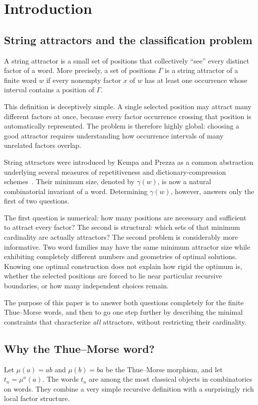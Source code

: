 \documentclass[11pt,a4paper]{article}
\theoremstyle{definition}\newtheorem{definition}[theorem]{Definition}
\theoremstyle{remark}\newtheorem{remark}[theorem]{Remark}
\begin{document}
\section{Introduction}

\subsection{String attractors and the classification problem}
A string attractor is a small set of positions that collectively ``see'' every distinct factor of a word. More precisely, a set of positions $\Gamma$ is a string attractor of a finite word $w$ if every nonempty factor $x$ of $w$ has at least one occurrence whose interval contains a position of $\Gamma$.

This definition is deceptively simple. A single selected position may attract many different factors at once, because every factor occurrence crossing that position is automatically represented. The problem is therefore highly global: choosing a good attractor requires understanding how occurrence intervals of many unrelated factors overlap.

String attractors were introduced by Kempa and Prezza as a common abstraction underlying several measures of repetitiveness and dictionary-compression schemes~\cite{KempaPrezza2018}. Their minimum size, denoted by $\gamma(w)$, is now a natural combinatorial invariant of a word. Determining $\gamma(w)$, however, answers only the first of two questions.

The first question is numerical: how many positions are necessary and sufficient to attract every factor? The second is structural: which sets of that minimum cardinality are actually attractors? The second problem is considerably more informative. Two word families may have the same minimum attractor size while exhibiting completely different numbers and geometries of optimal solutions. Knowing one optimal construction does not explain how rigid the optimum is, whether the selected positions are forced to lie near particular recursive boundaries, or how many independent choices remain.

The purpose of this paper is to answer both questions completely for the finite Thue--Morse words, and then to go one step further by describing the minimal constraints that characterize \emph{all} attractors, without restricting their cardinality.

\subsection{Why the Thue--Morse word?}
Let
$
\mu(a)=ab
$ 
and 
$
\mu(b)=ba
$
be the Thue--Morse morphism, and let $t_n=\mu^n(a)$. The words $t_n$ are among the most classical objects in combinatorics on words. They combine a very simple recursive definition with a surprisingly rich local factor structure.
\end{document}

